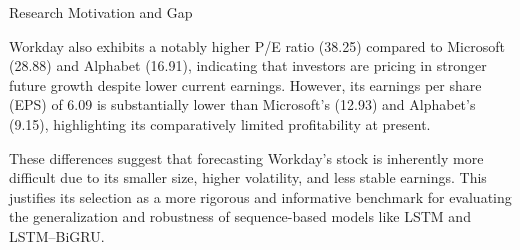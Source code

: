 \begin{frame}[label=researchgap]{Research Motivation and Gap}
{    Workday also exhibits a notably higher P/E ratio (38.25) compared to Microsoft (28.88) and Alphabet (16.91), indicating that investors are pricing in stronger future growth despite lower current earnings. However, its earnings per share (EPS) of 6.09 is substantially lower than Microsoft's (12.93) and Alphabet’s (9.15), highlighting its comparatively limited profitability at present.

    These differences suggest that forecasting Workday’s stock is inherently more difficult due to its smaller size, higher volatility, and less stable earnings. This justifies its selection as a more rigorous and informative benchmark for evaluating the generalization and robustness of sequence-based models like LSTM and LSTM–BiGRU.
    }
\end{frame}

